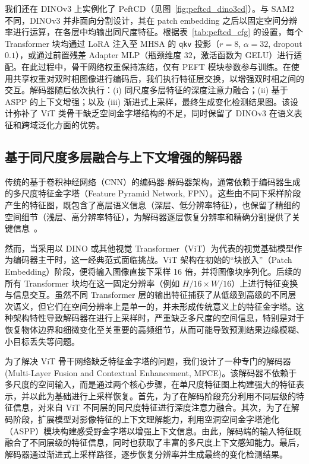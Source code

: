 我们还在 DINOv3 上实例化了 PeftCD（见图~\ref{fig:peftcd_dino3cd}）。与 SAM2 不同，DINOv3 并非面向分割设计，其在 patch embedding 之后以固定空间分辨率进行运算，在各层中均输出同尺度特征。根据表~\ref{tab:peftcd_cfg} 的设置，每个 Transformer 块均通过 LoRA 注入至 MHSA 的 \texttt{qkv} 投影（$r{=}8$, $\alpha{=}32$, dropout $0.1$），或通过前置残差 Adapter MLP（瓶颈维度 $32$，激活函数为 GELU）进行适配。在此过程中，骨干网络权重保持冻结，仅有 PEFT 模块参数参与训练。在使用共享权重对双时相图像进行编码后，我们执行特征层交换，以增强双时相之间的交互。解码器随后依次执行：(i) 同尺度多层特征的深度注意力融合；(ii) 基于 ASPP 的上下文增强；以及 (iii) 渐进式上采样，最终生成变化检测结果图。该设计弥补了 ViT 类骨干缺乏空间金字塔结构的不足，同时保留了 DINOv3 在语义表征和跨域泛化方面的优势。  



\subsection{基于同尺度多层融合与上下文增强的解码器}

传统的基于卷积神经网络（CNN）的编码器-解码器架构，通常依赖于编码器生成的多尺度特征金字塔（Feature Pyramid Network, FPN）。这些由不同下采样阶段产生的特征图，既包含了高层语义信息（深层、低分辨率特征），也保留了精细的空间细节（浅层、高分辨率特征），为解码器逐层恢复分辨率和精确分割提供了关键信息~\cite{lin_feature_2017}。

然而，当采用以 DINO 或其他视觉 Transformer（ViT）为代表的视觉基础模型作为编码器主干时，这一经典范式面临挑战。ViT 架构在初始的“块嵌入”（Patch Embedding）阶段，便将输入图像直接下采样 16 倍，并将图像块序列化。后续的所有 Transformer 块均在这一固定分辨率（例如 $H/16 \times W/16$）上进行特征变换与信息交互。虽然不同 Transformer 层的输出特征捕获了从低级到高级的不同层次语义，但它们在空间分辨率上是单一的，并未形成传统意义上的特征金字塔。这种架构特性导致解码器在进行上采样时，严重缺乏多尺度的空间信息，特别是对于恢复物体边界和细微变化至关重要的高频细节，从而可能导致预测结果边缘模糊、小目标丢失等问题。

为了解决 ViT 骨干网络缺乏特征金字塔的问题，我们设计了一种专门的解码器(Multi-Layer Fusion and Contextual Enhancement, MFCE)。该解码器不依赖于多尺度的空间输入，而是通过两个核心步骤，在单尺度特征图上构建强大的特征表示，并以此为基础进行上采样恢复。首先，为了在解码阶段充分利用不同层级的特征信息，对来自 ViT 不同层的同尺度特征进行深度注意力融合。其次，为了在解码阶段，扩展模型对影像特征的上下文理解能力，利用空洞空间金字塔池化（ASPP）模块构建感受野金字塔以增强上下文信息。由此，解码端的输入特征既融合了不同层级的特征信息，同时也获取了丰富的多尺度上下文感知能力。最后，解码器通过渐进式上采样路径，逐步恢复分辨率并生成最终的变化检测结果。

